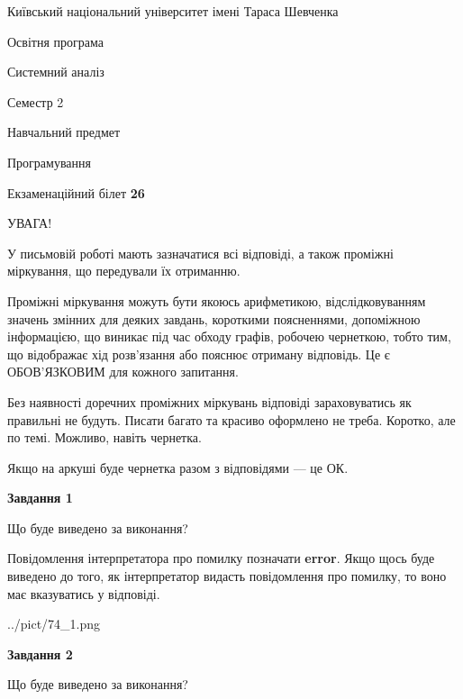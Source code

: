 \documentclass[12pt, ukrainian]{article}
\begin{document}
{{\begin {small}\par
{ \center  Київський національний університет імені Тараса Шевченка \par}
{\parbox {5 cm}{Освітня програма \hfill}{\parbox {7 cm}{Системний аналіз \hfill}}\parbox {6 cm}{\hfill Семестр 2}}\par
{\parbox {5 cm} {Навчальний предмет \hfill}\parbox {7 cm}{Програмування \hfill}\parbox {6cm}{\hfill}\par}\vspace{-7pt} \end{small}}{\center Екзаменаційний білет \No \textbf
{ 26 }\par}}
{
\begin {large}
УВАГА!

У письмовій роботі мають зазначатися всі відповіді, а також проміжні міркування, що передували їх отриманню.

Проміжні міркування можуть бути якоюсь арифметикою, відслідковуванням зна\-чень змінних для деяких завдань,
короткими поясненнями, допоміжною інформацією, що виникає під час обходу графів, робочею чернеткою,
тобто тим, що відображає хід розв’язання або пояснює отриману відповідь.
Це є ОБОВ’ЯЗКОВИМ для кожного запитання.

Без наявності доречних проміжних міркувань відповіді зараховуватись як правиль\-ні не будуть.
Писати багато та красиво оформлено не треба. Коротко, але по темі. Можли\-во, навіть чернетка.

Якщо на аркуші буде чернетка разом з відповідями --- це ОК.

\newpage

{\begin {center}\textbf{Завдання 1}\end {center}}\par
Що буде виведено за виконання?

Повідомлення інтерпретатора про помилку позначати \textbf{error}.
Якщо щось буде виведено до того, як інтерпретатор видасть повідомлення про помилку, 
то воно має вказуватись у відповіді. \par


\begin{center}
	{../pict/74_1.png}
\end{center}
\newpage

{\begin {center}\textbf{Завдання 2}\end {center}}\par
Що буде виведено за виконання?


\end{large}}
\end{document}
